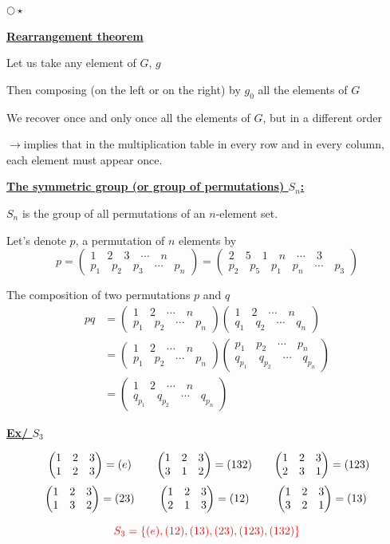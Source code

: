 \documentclass[12pt,a4paper]{article}
\newcommand{\heading}[1]{\par\vspace{0.2em}\underline{\textbf{#1}}\par\vspace{0.15em}}
\newcommand{\arrowline}{\(\longrightarrow\)\quad}
\newcommand{\pmtx}[2]{\begin{pmatrix}#1\\#2\end{pmatrix}}
\begin{document}
\(\bigcirc\!\star\)\quad\heading{Rearrangement theorem}

Let us take any element of \(G\), \(g\)

Then composing (on the left or on the right) by \(g_0\) all the elements of \(G\)

We recover once and only once all the elements of \(G\), but in a different order

\arrowline implies that in the multiplication table in every row and in every column, each element must appear once.

\newpage

\heading{The symmetric group (or group of permutations) \(S_n\):}

\(S_n\) is the group of all permutations of an \(n\)-element set.

Let's denote \(p\), a permutation of \(n\) elements by
\[
p=\pmtx{1\quad 2\quad 3\quad\cdots\quad n}{p_1\quad p_2\quad p_3\quad\cdots\quad p_n}
=\pmtx{2\quad 5\quad 1\quad n\quad\cdots\quad 3}{p_2\quad p_5\quad p_1\quad p_n\quad\cdots\quad p_3}
\]

The composition of two permutations \(p\) and \(q\)
\[
\begin{aligned}
pq&=\pmtx{1\quad 2\quad\cdots\quad n}{p_1\quad p_2\quad\cdots\quad p_n}
\pmtx{1\quad 2\quad\cdots\quad n}{q_1\quad q_2\quad\cdots\quad q_n}\\
&=\pmtx{1\quad 2\quad\cdots\quad n}{p_1\quad p_2\quad\cdots\quad p_n}
\pmtx{p_1\quad p_2\quad\cdots\quad p_n}{q_{p_1}\quad q_{p_2}\quad\cdots\quad q_{p_n}}\\
&=\pmtx{1\quad 2\quad\cdots\quad n}{q_{p_1}\quad q_{p_2}\quad\cdots\quad q_{p_n}}
\end{aligned}
\]

\heading{Ex/ \(S_3\)}

\[
\begin{array}{c@{\qquad}c@{\qquad}c}
\pmtx{1&2&3}{1&2&3}=(e) &
\pmtx{1&2&3}{3&1&2}=(132) &
\pmtx{1&2&3}{2&3&1}=(123)\\[1.2em]
\pmtx{1&2&3}{1&3&2}=(23) &
\pmtx{1&2&3}{2&1&3}=(12) &
\pmtx{1&2&3}{3&2&1}=(13)
\end{array}
\]

\[
\textcolor{red}{S_3=\{(e),(12),(13),(23),(123),(132)\}}
\]
\end{document}

